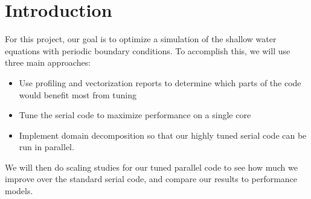 \section{Introduction}

For this project, our goal is to optimize a simulation of the shallow water equations with periodic boundary conditions. To accomplish this, we will use three main approaches:
\begin{itemize}
	\item Use profiling and vectorization reports to determine which parts of the code would benefit most from tuning
	\item Tune the serial code to maximize performance on a single core
	\item Implement domain decomposition so that our highly tuned serial code can be run in parallel.
\end{itemize}
We will then do scaling studies for our tuned parallel code to see how much we improve over the standard serial code, and compare our results to performance models.